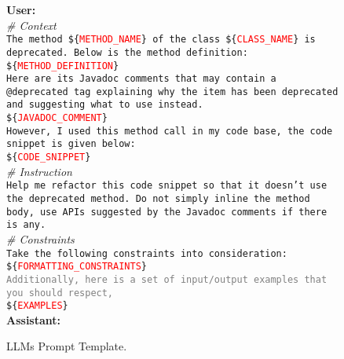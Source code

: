 \documentclass[sigconf,review,anonymous]{acmart}
\newcommand{\templatevar}[1]{\$\{\textcolor{red}{#1}\}}
\begin{document}
\begin{figure}
  \centering
  \begin{tcolorbox}[
    colback=prompt_bg,
    colframe=prompt_title,
    title=Prompt Template,
    subtitle style={boxrule=0.4pt, colback=yellow!50!blue!25!white, colupper=black}
  ]
  \scriptsize

  \textbf{User:}\\
  \textit{\# Context}\\
  \texttt{The method \templatevar{METHOD\_NAME} of the class \templatevar{CLASS\_NAME} is deprecated. Below is the method definition:}\\
  \texttt{\templatevar{METHOD\_DEFINITION}}\\

  \texttt{Here are its Javadoc comments that may contain a @deprecated tag explaining why the item has been deprecated and suggesting what to use instead.}\\
  \texttt{\templatevar{JAVADOC\_COMMENT}}\\

  \texttt{However, I used this method call in my code base, the code snippet is given below:}\\
  \texttt{\templatevar{CODE\_SNIPPET}}\\

  \textit{\# Instruction}\\
  \texttt{Help me refactor this code snippet so that it doesn't use the deprecated method. Do not simply inline the method body, use APIs suggested by the Javadoc comments if there is any.}\\

  \textit{\# Constraints}\\
  \texttt{Take the following constraints into consideration:}\\
  \texttt{\templatevar{FORMATTING\_CONSTRAINTS}}\\

  \texttt{\textcolor{gray}{Additionally, here is a set of input/output examples that you should respect,}}\\
  \texttt{\templatevar{EXAMPLES}}\\

  \textbf{Assistant:}\\
  \end{tcolorbox}
  \caption{LLMs Prompt Template.}
  \label{fig:prompt}
\end{figure}
\end{document}
